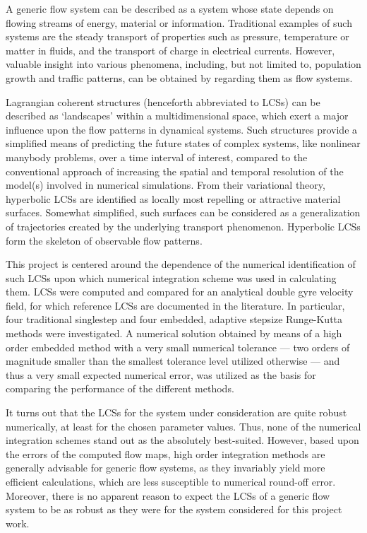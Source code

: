 A generic flow system can be described as a system whose state depends on
flowing streams of energy, material or information. Traditional examples of
such systems are the steady transport of properties such as pressure,
temperature or matter in fluids, and the transport of charge in electrical
currents. However, valuable insight into various phenomena, including, but not
limited to, population growth and traffic patterns, can be obtained by regarding
them as flow systems.

Lagrangian coherent structures (henceforth abbreviated to LCSs) can be described
as `landscapes' within a multidimensional space, which exert a major influence
upon the flow patterns in dynamical systems. Such structures provide a
simplified means of predicting the future states of complex systems, like
nonlinear manybody problems, over a time interval of interest, compared to the
conventional approach of increasing the spatial and temporal resolution of the
model(s) involved in numerical simulations. From their variational theory,
hyperbolic LCSs are identified as locally most repelling or attractive material
surfaces. Somewhat simplified, such surfaces can be considered as a
generalization of trajectories created by the underlying transport phenomenon.
Hyperbolic LCSs form the skeleton of observable flow patterns.

This project is centered around the dependence of the numerical identification
of such LCSs upon which numerical integration scheme was used in calculating
them. LCSs were computed and compared for an analytical double gyre velocity
field, for which reference LCSs are documented in the literature. In particular,
four traditional singlestep and four embedded, adaptive stepsize Runge-Kutta
methods were investigated. A numerical solution obtained by means of a high
order embedded method with a very small numerical tolerance --- two orders of
magnitude smaller than the smallest tolerance level utilized otherwise ---
and thus a very small expected numerical error, was utilized as the basis
for comparing the performance of the different methods.

It turns out that the LCSs for the system under consideration are quite robust
numerically, at least for the chosen parameter values. Thus, none of the
numerical integration schemes stand out as the absolutely best-suited. However,
based upon the errors of the computed flow maps, high order integration
methods are generally advisable for generic flow systems, as they invariably
yield more efficient calculations, which are less susceptible to numerical
round-off error. Moreover, there is no apparent reason to expect the LCSs of
a generic flow system to be as robust as they were for the system considered
for this project work.

